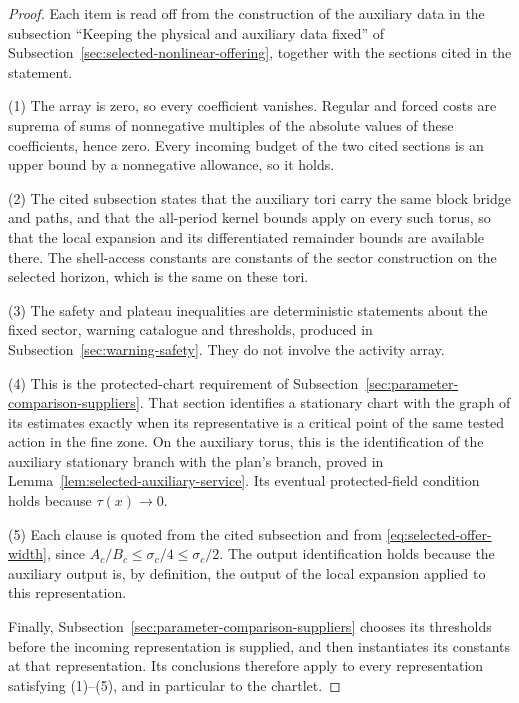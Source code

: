 \begin{proof}
Each item is read off from the construction of the auxiliary data in
the subsection ``Keeping the physical and auxiliary data fixed'' of
Subsection~\ref{sec:selected-nonlinear-offering}, together with the
sections cited in the statement.

(1) The array is zero, so every coefficient vanishes. Regular and
forced costs are suprema of sums of nonnegative multiples of the
absolute values of these coefficients, hence zero. Every incoming
budget of the two cited sections is an upper bound by a nonnegative
allowance, so it holds.

(2) The cited subsection states that the auxiliary tori carry the same
block bridge and paths, and that the all-period kernel bounds apply on
every such torus, so that the local expansion and its differentiated
remainder bounds are available there. The shell-access constants are
constants of the sector construction on the selected horizon, which is
the same on these tori.

(3) The safety and plateau inequalities are deterministic statements
about the fixed sector, warning catalogue and thresholds, produced in
Subsection~\ref{sec:warning-safety}. They do not involve the activity
array.

(4) This is the protected-chart requirement of
Subsection~\ref{sec:parameter-comparison-suppliers}. That section
identifies a stationary chart with the graph of its estimates exactly
when its representative is a critical point of the same tested action
in the fine zone. On the auxiliary torus, this is the identification of
the auxiliary stationary branch with the plan's branch, proved in
Lemma~\ref{lem:selected-auxiliary-service}. Its eventual protected-field
condition holds because $\tau(x)\to0$.

(5) Each clause is quoted from the cited subsection and from
\eqref{eq:selected-offer-width}, since
$A_c/B_c\le\sigma_c/4\le\sigma_c/2$. The output identification holds
because the auxiliary output is, by definition, the output of the local
expansion applied to this representation.

Finally, Subsection~\ref{sec:parameter-comparison-suppliers} chooses its
thresholds before the incoming representation is supplied, and then
instantiates its constants at that representation. Its conclusions
therefore apply to every representation satisfying (1)--(5), and in
particular to the chartlet.
\end{proof}

